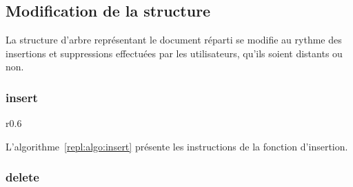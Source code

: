 \subsection{Modification de la structure}

La structure d'arbre représentant le document réparti se modifie au rythme des
insertions et suppressions effectuées par les utilisateurs, qu'ils soient
distants ou non. 

\subsubsection{insert}


\begin{wrapfigure}{r}{0.6\textwidth}
  \vspace{-35pt} %
  \begin{minipage}[t]{0.6\textwidth}
    \begin{algorithm}[H]
      
      \caption{\label{repl:algo:insert} Insert.}
    \end{algorithm}
  \end{minipage}
  \vspace{-15pt}
\end{wrapfigure}

L'algorithme~\ref{repl:algo:insert} présente les instructions de la fonction
d'insertion.


\subsubsection{delete}